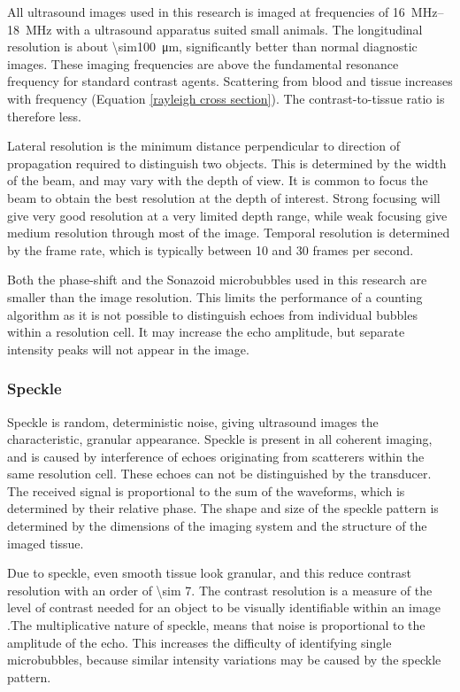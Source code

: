 All ultrasound images used in this research is imaged at frequencies of \SIrange{16}{18}{\mega\hertz} with a ultrasound apparatus suited small animals. The longitudinal resolution is about \SI{\sim100}{\micro\meter}, significantly better than normal diagnostic images. These imaging frequencies are above the fundamental resonance frequency for standard contrast agents. Scattering from blood and tissue increases with frequency (Equation \eqref{rayleigh cross section}). The contrast-to-tissue ratio is therefore less. 

Lateral resolution is the minimum distance perpendicular to direction of propagation required to distinguish two objects. This is determined by the width of the beam, and may vary with the depth of view. It is common to focus the beam to obtain the best resolution at the depth of interest. Strong focusing will give very good resolution at a very limited depth range, while weak focusing give medium resolution through most of the image. Temporal resolution is determined by the frame rate, which is typically between 10 and 30 frames per second. 

Both the phase-shift and the Sonazoid\texttrademark{} microbubbles used in this research are smaller than the image resolution. This limits the performance of a counting algorithm as it is not possible to distinguish echoes from individual bubbles within a resolution cell. It may increase the echo amplitude, but separate intensity peaks will not appear in the image.


\subsubsection{Speckle}
Speckle is random, deterministic noise, giving ultrasound images the characteristic, granular appearance. Speckle is present in all coherent imaging, and is caused by interference of echoes originating from scatterers within the same resolution cell. These echoes can not be distinguished by the transducer. The received signal is proportional to the sum of the waveforms, which is determined by their relative phase. The shape and size of the speckle pattern is determined by the dimensions of the imaging system and the structure of the imaged tissue\cite{Szabo2013}.

Due to speckle, even smooth tissue look granular, and this reduce contrast resolution with an order of \num{\sim 7}. The contrast resolution is a measure of the level of contrast needed for an object to be visually identifiable within an image .The multiplicative nature of speckle, means that noise is proportional to the amplitude of the echo. This increases the difficulty of identifying single microbubbles, because similar intensity variations may be caused by the speckle pattern. 

